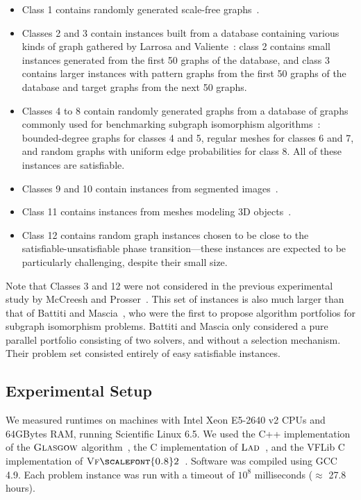 \documentclass{llncs}
\newcommand{\VFtwo}{$\textsc{Vf{\scalefont{0.8}2}}$\xspace}
\newcommand{\Glasgow}{$\textsc{Glasgow}$\xspace}
\newcommand{\LAD}{$\textsc{Lad}$\xspace}
\begin{document}
\begin{itemize}
\item Class 1 contains randomly generated scale-free graphs~\cite{constraints10}.
\item Classes 2 and 3 contain instances built from a database containing
    various kinds of graph gathered by Larrosa and Valiente~\cite{LV02}: class
    2 contains small instances generated from the first 50 graphs of the
    database, and class 3 contains larger instances with pattern graphs from
    the first 50 graphs of the database and target graphs from the next 50
    graphs.
\item Classes 4 to 8 contain randomly generated graphs from a database of
    graphs commonly used for benchmarking subgraph isomorphism
    algorithms~\cite{GraphDatabase1,GraphDatabase2}: bounded-degree graphs for
    classes 4 and 5, regular meshes for classes 6 and 7, and random graphs with
    uniform edge probabilities for class 8. All of these instances are
    satisfiable.
\item Classes 9 and 10 contain instances from segmented images~\cite{pr15,cviu11}.
\item Class 11 contains instances from meshes modeling 3D objects~\cite{cviu11}.
\item Class 12 contains random graph instances chosen to be close to the satisfiable-unsatisfiable
    phase transition---these instances are expected to be particularly challenging, despite their
    small size.
\end{itemize}

\noindent Note that Classes 3 and 12 were not considered in the previous experimental study by McCreesh and
Prosser~\cite{McCreesh:2015}.  This set of instances is also much larger than that of Battiti and
Mascia~\cite{battiti-mascia07}, who were the first to propose algorithm portfolios for subgraph
isomorphism problems.  Battiti and Mascia only considered a pure parallel portfolio consisting of
two solvers, and without a selection mechanism. Their problem set consisted entirely of easy
satisfiable instances.

\subsection{Experimental Setup}

We measured runtimes on machines with Intel Xeon E5-2640 v2 CPUs and 64GBytes RAM, running
Scientific Linux 6.5. We used the C++ implementation of the \Glasgow algorithm~\cite{McCreesh:2015},
the C implementation of \LAD{}~\cite{Solnon:2010}, and the VFLib C
implementation of \VFtwo{}~\cite{Cordella:2004}. Software was compiled using GCC 4.9. Each problem instance was run with a
timeout of $10^8$ milliseconds ($\approx$ 27.8 hours).
\end{document}
